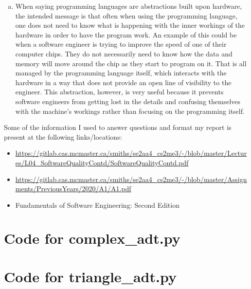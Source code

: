 \documentclass[12pt]{article}
\begin{document}
\begin{enumerate}[(a)]
\item When saying programming languages are abstractions built upon hardware, the intended message is that often when using the programming language, one does not need to know what is happening with the inner workings of the hardware in order to have the program work. An example of this could be when a software engineer is trying to improve the speed of one of their computer chips. They do not necessarily need to know how the data and memory will move around the chip as they start to program on it. That is all managed by the programming language itself, which interacts with the hardware in a way that does not provide an open line of visibility to the engineer. This abstraction, however, is very useful because it prevents software engineers from getting lost in the details and confusing themselves with the machine's workings rather than focusing on the programming itself. 
\end{enumerate}
Some of the information I used to answer questions and format my report is present at the following links/locations:
\begin{itemize}
	\item \url{https://gitlab.cas.mcmaster.ca/smiths/se2aa4_cs2me3/-/blob/master/Lectures/L04_SoftwareQualityContd/SoftwareQualityContd.pdf}
	\item \url{https://gitlab.cas.mcmaster.ca/smiths/se2aa4_cs2me3/-/blob/master/Assignments/PreviousYears/2020/A1/A1.pdf}
	\item Fundamentals of Software Engineering: Second Edition
\end{itemize}

\newpage

\lstset{language=Python, basicstyle=\tiny, breaklines=true, showspaces=false,
  showstringspaces=false, breakatwhitespace=true}

\def\thesection{\Alph{section}}

\section{Code for complex\_adt.py}

\noindent 

\newpage

\section{Code for triangle\_adt.py}
\end{document}
